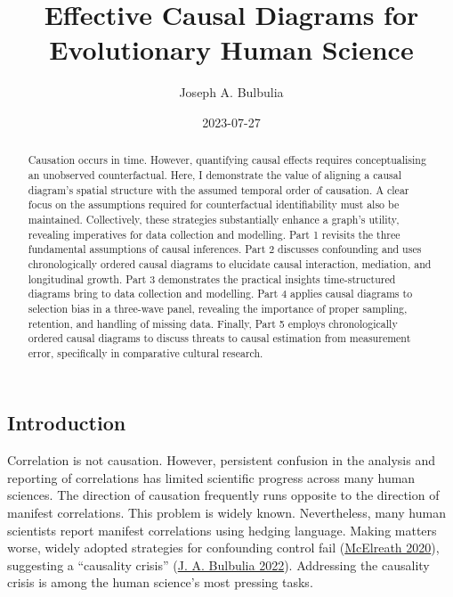 \documentclass[
  singlecolumn]{article}
\title{Effective Causal Diagrams for Evolutionary Human Science}
\author{Joseph A. Bulbulia}
\affil{%
                  Victoria University of Wellington, New Zealand, School
                  of Psychology, Centre for Applied Cross-Cultural
                  Research
              }
\date{2023-07-27}
\begin{document}
\maketitle
\begin{abstract}
Causation occurs in time. However, quantifying causal effects requires
conceptualising an unobserved counterfactual. Here, I demonstrate the
value of aligning a causal diagram's spatial structure with the assumed
temporal order of causation. A clear focus on the assumptions required
for counterfactual identifiability must also be maintained.
Collectively, these strategies substantially enhance a graph's utility,
revealing imperatives for data collection and modelling. Part 1 revisits
the three fundamental assumptions of causal inferences. Part 2 discusses
confounding and uses chronologically ordered causal diagrams to
elucidate causal interaction, mediation, and longitudinal growth. Part 3
demonstrates the practical insights time-structured diagrams bring to
data collection and modelling. Part 4 applies causal diagrams to
selection bias in a three-wave panel, revealing the importance of proper
sampling, retention, and handling of missing data. Finally, Part 5
employs chronologically ordered causal diagrams to discuss threats to
causal estimation from measurement error, specifically in comparative
cultural research.
\end{abstract}
\ifdefined\Shaded\renewenvironment{Shaded}{\begin{tcolorbox}[boxrule=0pt, breakable, frame hidden, interior hidden, borderline west={3pt}{0pt}{shadecolor}, enhanced, sharp corners]}{\end{tcolorbox}}\fi

\hypertarget{introduction}{%
\subsection{Introduction}\label{introduction}}

Correlation is not causation. However, persistent confusion in the
analysis and reporting of correlations has limited scientific progress
across many human sciences. The direction of causation frequently runs
opposite to the direction of manifest correlations. This problem is
widely known. Nevertheless, many human scientists report manifest
correlations using hedging language. Making matters worse, widely
adopted strategies for confounding control fail
(\protect\hyperlink{ref-mcelreath2020}{McElreath 2020}), suggesting a
``causality crisis'' (\protect\hyperlink{ref-bulbulia2022}{J. A.
Bulbulia 2022}). Addressing the causality crisis is among the human
science's most pressing tasks.
\end{document}
